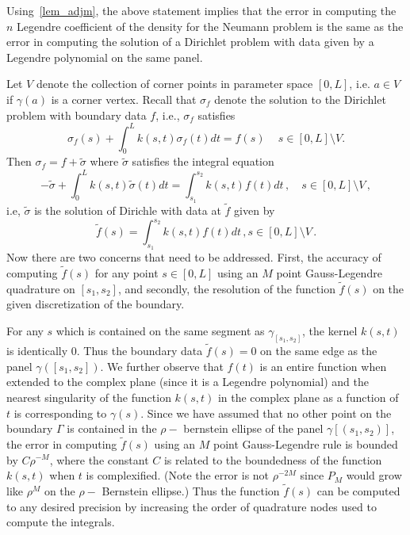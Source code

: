 \documentclass[12pt]{article}
\begin{document}
Using~\cref{lem_adjm}, the above statement implies that the error in computing the $n$ Legendre coefficient of
the density for the Neumann problem is the same as the error in computing the solution of a Dirichlet problem with 
data given by a Legendre polynomial on the same panel.  %

Let $V$ denote the collection of corner points in parameter space $[0,L]$, i.e. $a \in V$ if $\gamma(a)$ is a corner vertex.
Recall that $\sigma_{f}$ denote the solution to the Dirichlet problem with boundary data $f$, i.e., 
$\sigma_{f}$ satisfies
\begin{equation}
\sigma_{f}(s)   + \int_{0}^{L} k(s,t) \sigma_{f}(t) dt  = f(s) \,  \quad s\in[0,L]\setminus{V}.
\end{equation}
 Then $\sigma_{f} = f + \tilde{\sigma}$ where $\tilde{\sigma}$ satisfies the integral equation
 \begin{equation}
-\tilde{\sigma}+ \int_{0}^{L} k(s,t) \tilde{\sigma}(t) dt = \int_{s_{1}}^{s_{2}} k(s,t) f(t) dt \, , \quad s\in[0,L] \setminus V \, ,
 \end{equation}
i.e, $\tilde{\sigma}$ is the solution of Dirichle with data at $\tilde{f}$ given by
\begin{equation}
\tilde{f}(s) = \int_{s_{1}}^{s_{2}} k(s,t) f(t) dt \, , s \in [0,L] \setminus V \, .
\end{equation}
Now there are two concerns that need to be addressed. First, the accuracy of computing $\tilde{f}(s)$ 
for any point $s \in [0,L]$ using an $M$ point Gauss-Legendre quadrature on $[s_{1},s_{2}]$, and secondly, 
the resolution of the function $\tilde{f}(s)$ on the given discretization of the boundary. 

For any $s$ which is contained on the same segment as $\gamma_{[s_{1},s_{2}]}$, the kernel $k(s,t)$ is identically $0$.
Thus the boundary data $\tilde{f}(s)=0$  on the same edge as the panel $\gamma([s_{1},s_{2}])$. 
We further observe that $f(t)$ is an entire function when extended to the complex plane (since it is a Legendre polynomial)
and the nearest singularity of the function $k(s,t)$ in the complex plane as a function of $t$ is corresponding to $\gamma(s)$.
Since we have assumed that no other point on the boundary $\Gamma$ is contained in the $\rho-$ bernstein ellipse
of the panel $\gamma[(s_{1},s_{2})]$, 
the error in computing $\tilde{f}(s)$ using an $M$ point Gauss-Legendre rule is bounded by $C \rho^{-M}$, where
the constant $C$ is related to the boundedness of the function $k(s,t)$ when $t$ is complexified.
(Note the error is not $\rho^{-2M}$ since $P_{M}$ would grow like $\rho^{M}$ on the $\rho-$ Bernstein ellipse.) 
Thus the function $\tilde{f}(s)$ can be computed to any desired precision by increasing the order of quadrature nodes
used to compute the integrals. 
\end{document}

